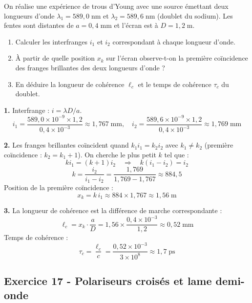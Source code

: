 \documentclass[12pt,a4paper]{article}
\begin{document}
\begin{boiteexercice}
On réalise une expérience de trous d'Young avec une source émettant deux longueurs d'onde $\lambda_1 = 589{,}0\;\text{nm}$ et $\lambda_2 = 589{,}6\;\text{nm}$ (doublet du sodium). Les fentes sont distantes de $a = 0{,}4\;\text{mm}$ et l'écran est à $D = 1{,}2\;\text{m}$.
\begin{enumerate}
  \item Calculer les interfranges $i_1$ et $i_2$ correspondant à chaque longueur d'onde.
  \item À partir de quelle position $x_k$ sur l'écran observe-t-on la première coïncidence des franges brillantes des deux longueurs d'onde ?
  \item En déduire la longueur de cohérence $\ell_c$ et le temps de cohérence $\tau_c$ du doublet.
\end{enumerate}
\end{boiteexercice}

\begin{boitecorrige}
\textbf{1.} Interfrange : $i = \lambda D/a$.
\[
i_1 = \frac{589{,}0\times10^{-9}\times 1{,}2}{0{,}4\times10^{-3}} \approx 1{,}767\;\text{mm}, \quad i_2 = \frac{589{,}6\times10^{-9}\times 1{,}2}{0{,}4\times10^{-3}} \approx 1{,}769\;\text{mm}
\]

\textbf{2.} Les franges brillantes coïncident quand $k_1 i_1 = k_2 i_2$ avec $k_1 \neq k_2$ (première coïncidence : $k_2 = k_1 + 1$). On cherche le plus petit $k$ tel que :
\[
k i_1 = (k+1) i_2 \quad\Longrightarrow\quad k(i_1-i_2) = i_2
\]
\[
k = \frac{i_2}{i_1 - i_2} = \frac{1{,}769}{1{,}769 - 1{,}767} \approx 884{,}5
\]
Position de la première coïncidence :
\[
x_k = k\,i_1 \approx 884 \times 1{,}767 \approx 1{,}56\;\text{m}
\]

\textbf{3.} La longueur de cohérence est la différence de marche correspondante :
\[
\ell_c = x_k\cdot\frac{a}{D} = 1{,}56 \times \frac{0{,}4\times10^{-3}}{1{,}2} \approx 0{,}52\;\text{mm}
\]
Temps de cohérence :
\[
\tau_c = \frac{\ell_c}{c} = \frac{0{,}52\times10^{-3}}{3\times10^8} \approx 1{,}7\;\text{ps}
\]
\end{boitecorrige}

\subsection*{Exercice 17 - Polariseurs croisés et lame demi-onde \niveau{\moyen}}
\end{document}
